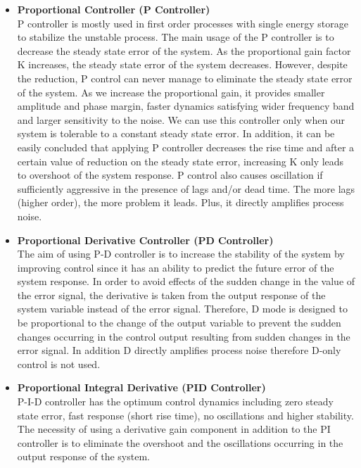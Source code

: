 \begin{itemize}
    \item \textbf{Proportional Controller (P Controller)} \\
    P controller is mostly used in first order processes with single energy storage to stabilize the unstable process. The main usage of the P controller is to decrease the steady state error of the system. As the proportional gain factor K increases, the steady state error of the system decreases. However, despite the reduction, P control can never manage to eliminate the steady state error of the system. As we increase the proportional gain, it provides smaller amplitude and phase margin, faster dynamics satisfying wider frequency band and larger sensitivity to the noise. We can use this controller only when our system is tolerable to a constant steady state error. In addition, it can be easily concluded that applying P controller decreases the rise time and after a certain value of reduction on the steady state error, increasing K only leads to overshoot of the system response. P control also causes oscillation if suﬃciently aggressive in the presence of lags and/or dead time. The more lags (higher order), the more problem it leads. Plus, it directly amplifies process noise. 
    \item \textbf{Proportional Derivative Controller (PD Controller)} \\
    The aim of using P-D controller is to increase the stability of the system by improving control since it has an ability to predict the future error of the system response. In order to avoid effects of the sudden change in the value of the error signal, the derivative is taken from the output response of the system variable instead of the error signal. Therefore, D mode is designed to be proportional to the change of the output variable to prevent the sudden changes occurring in the control output resulting from sudden changes in the error signal. In addition D directly amplifies process noise therefore D-only control is not used.
    \item \textbf{Proportional Integral Derivative (PID Controller)}\\ P-I-D controller has the optimum control dynamics including zero steady state error, fast response (short rise time), no oscillations and higher stability. The necessity of using a derivative gain component in addition to the PI controller is to eliminate the overshoot and the oscillations occurring in the output response of the system.
\end{itemize} 
